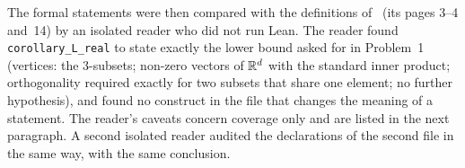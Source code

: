 The formal statements were then compared with the definitions of~\cite{HI} (its pages 3--4 and~14) by an
isolated reader who did not run Lean. The reader found \texttt{corollary\_L\_real} to state exactly the lower
bound asked for in Problem~1 (vertices: the $3$-subsets; non-zero vectors of $\mathbb{R}^d$ with the standard inner
product; orthogonality required exactly for two subsets that share one element; no further hypothesis), and
found no construct in the file that changes the meaning of a statement. The reader's caveats concern
coverage only and are listed in the next paragraph. A second isolated reader audited the declarations of the
second file in the same way, with the same conclusion.
